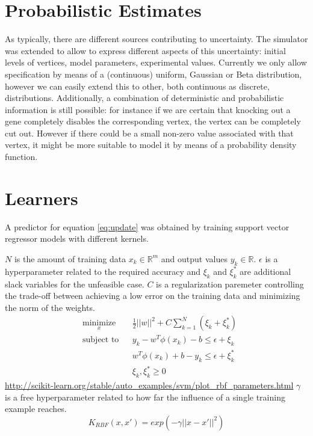 \section{Probabilistic Estimates}
As typically, there are different sources contributing to uncertainty. The simulator was extended to allow to express different aspects of this uncertainty: initial levels of vertices, model parameters, experimental values.
Currently we only allow specification by means of a (continuous) uniform, Gaussian or Beta distribution, however we can easily extend this to other, both continuous as discrete, distributions.	
Additionally, a combination of deterministic and probabilistic information is still possible: for instance if we are certain that knocking out a gene completely disables the corresponding vertex, the vertex can be completely cut out. However if
there could be a small non-zero value associated with that vertex, it might be more suitable to model it by means of a probability density function. 
\section{Learners}
A predictor for equation \ref{eq:update} was obtained by training support vector regressor models with different kernels. 	
 
 $N$ is the amount of training data $x_k \in \mathbb{R}^m$ and output values $y_k \in \mathbb{R}$.
 $\epsilon$ is a hyperparameter related to the required accuracy and $\xi_k$ and $\xi_k^{*}$ are additional slack variables
 for the unfeasible case.
 $C$ is a regularization paremeter controlling the trade-off between achieving a low error on the training data and minimizing
 the norm of the weights. 
 \begin{equation*}
\begin{aligned}
& \underset{x}{\text{minimize}}
& & \frac{1}{2}||w||^2 + C\sum_{k=1}^N (\xi_k + \xi_k^*)\\
& \text{subject to}
& & y_k - w^T\phi(x_k) - b \leq \epsilon +\xi_k \\
& & & w^T\phi(x_k) + b - y_k \leq \epsilon + \xi_k^* \\
& & & \xi_k, \xi_k^* \geq 0
\end{aligned}
\end{equation*}
\url{http://scikit-learn.org/stable/auto_examples/svm/plot_rbf_parameters.html}
$\gamma$ is a free hyperparameter related to how far the influence of a single training example reaches. 
\begin{equation*}
 K_{RBF}(x,x') = exp( -\gamma|| x - x' ||^2 )
\end{equation*}


